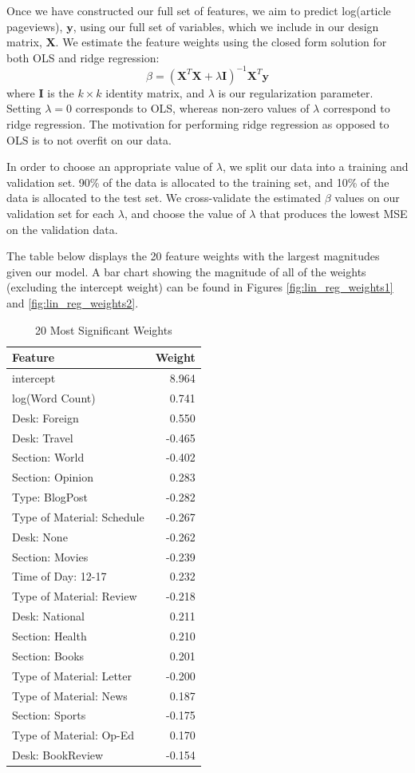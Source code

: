 \documentclass[fleqn,12pt]{SelfArx} %
\begin{document}
Once we have constructed our full set of features, we aim to predict log(article pageviews), $\mathbf{y}$, using our full set of variables, which we include in our design matrix, $\mathbf{X}$. We estimate the feature weights using the closed form solution for both OLS and ridge regression:
\begin{equation}
\beta = (\mathbf{X}^T\mathbf{X} + \lambda \mathbf{I})^{-1}\mathbf{X}^T\mathbf{y}
\end{equation}
where $\mathbf{I}$ is the $k \times k$ identity matrix, and $\lambda$ is our regularization parameter. Setting $\lambda = 0$ corresponds to OLS, whereas non-zero values of $\lambda$ correspond to ridge regression. The motivation for performing ridge regression as opposed to OLS is to not overfit on our data. 

In order to choose an appropriate value of $\lambda$, we split our data into a training and validation set. 90\% of the data is allocated to the training set, and 10\% of the data is allocated to the test set. We cross-validate the estimated $\beta$ values on our validation set for each $\lambda$, and choose the value of $\lambda$ that produces the lowest MSE on the validation data.

The table below displays the 20 feature weights with the largest magnitudes given our model. A bar chart showing the magnitude of all of the weights (excluding the intercept weight) can be found in Figures \ref{fig:lin_reg_weights1} and \ref{fig:lin_reg_weights2}.

\begin{table}[hbt]
\caption{20 Most Significant Weights}
\centering
\begin{tabular}{lr}
\toprule
Feature  &  Weight\\
\midrule
intercept & 8.964\\
log(Word Count) & 0.741\\
Desk: Foreign & 0.550\\
Desk: Travel & -0.465\\
Section: World & -0.402\\
Section: Opinion & 0.283\\
Type: BlogPost & -0.282\\
Type of Material: Schedule & -0.267\\
Desk: None & -0.262\\
Section: Movies & -0.239\\
Time of Day: 12-17 & 0.232\\
Type of Material: Review & -0.218\\
Desk: National & 0.211\\
Section: Health & 0.210\\
Section: Books & 0.201\\
Type of Material: Letter & -0.200\\
Type of Material: News & 0.187\\
Section: Sports & -0.175\\
Type of Material: Op-Ed & 0.170\\
Desk: BookReview & -0.154\\
\bottomrule
\end{tabular}
\end{table}
\end{document}
